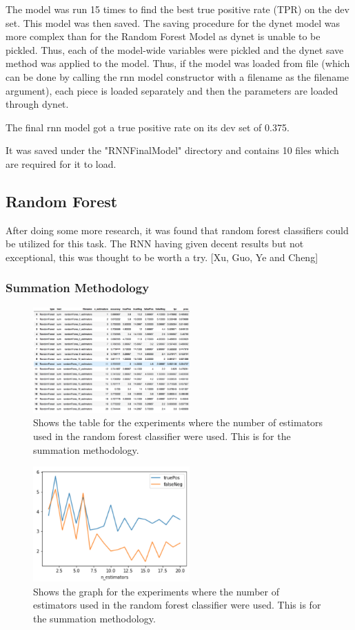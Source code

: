 \documentclass[twoside,twocolumn]{article}
\begin{document}
The model was run 15 times to find the best true positive rate (TPR) on the dev set.
This model was then saved. The saving procedure for the dynet model was more complex than
for the Random Forest Model as dynet is unable to be pickled. Thus, each of the model-wide
variables were pickled and the dynet save method was applied to the model. Thus, if the model
was loaded from file (which can be done by calling the rnn model constructor with a filename
as the filename argument), each piece is loaded separately and then the parameters are loaded
through dynet.

The final rnn model got a true positive rate on its dev set of 0.375.

It was saved under the "RNNFinalModel" directory and contains 10 files which are required for it
to load.


\subsection{Random Forest}

After doing some more research, it was found that random forest classifiers could
be utilized for this task. The RNN having given decent results but not exceptional,
this was thought to be worth a try. [Xu, Guo, Ye and Cheng]

\subsubsection{Summation Methodology}

\begin{figure}[H]
\includegraphics[width=6cm]{randForest_estimators_summed_table}
\centering
\caption{Shows the table for the experiments where the number of estimators used
in the random forest classifier were used. This is for the summation methodology.}
\end{figure}

\begin{figure}[H]
\includegraphics[width=6cm]{randForest_estimators_summed_graph}
\centering
\caption{Shows the graph for the experiments where the number of estimators used
in the random forest classifier were used. This is for the summation methodology.}
\end{figure}
\end{document}
